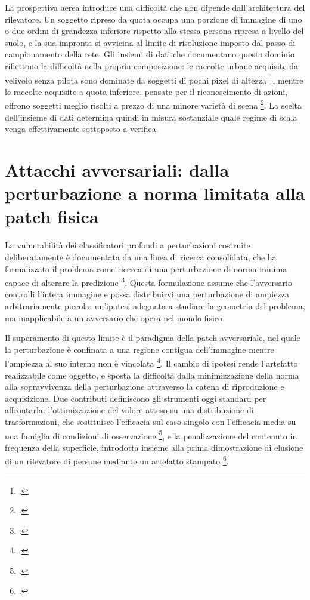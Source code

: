 \documentclass[a4paper,12pt]{report}
\begin{document}
La prospettiva aerea introduce una difficoltà che non dipende dall'architettura
del rilevatore. Un soggetto ripreso da quota occupa una porzione di immagine di
uno o due ordini di grandezza inferiore rispetto alla stessa persona ripresa a
livello del suolo, e la sua impronta si avvicina al limite di risoluzione
imposto dal passo di campionamento della rete. Gli insiemi di dati che
documentano questo dominio riflettono la difficoltà nella propria composizione:
le raccolte urbane acquisite da velivolo senza pilota sono dominate da soggetti
di pochi pixel di altezza \footcite{zhu_2021_visdrone}, mentre le raccolte
acquisite a quota inferiore, pensate per il riconoscimento di azioni, offrono
soggetti meglio risolti a prezzo di una minore varietà di scena
\footcite{barekatain_2017_okutama}. La scelta dell'insieme di dati determina
quindi in misura sostanziale quale regime di scala venga effettivamente
sottoposto a verifica.

\section{Attacchi avversariali: dalla perturbazione a norma limitata alla patch fisica}
\label{sec:sota_adversarial}

La vulnerabilità dei classificatori profondi a perturbazioni costruite
deliberatamente è documentata da una linea di ricerca consolidata, che ha
formalizzato il problema come ricerca di una perturbazione di norma minima
capace di alterare la predizione \footcite{carlini_2017}. Questa formulazione
assume che l'avversario controlli l'intera immagine e possa distribuirvi una
perturbazione di ampiezza arbitrariamente piccola: un'ipotesi adeguata a
studiare la geometria del problema, ma inapplicabile a un avversario che opera
nel mondo fisico.

Il superamento di questo limite è il paradigma della patch avversariale, nel
quale la perturbazione è confinata a una regione contigua dell'immagine mentre
l'ampiezza al suo interno non è vincolata \footcite{brown_2017_patch}. Il
cambio di ipotesi rende l'artefatto realizzabile come oggetto, e sposta la
difficoltà dalla minimizzazione della norma alla sopravvivenza della
perturbazione attraverso la catena di riproduzione e acquisizione. Due
contributi definiscono gli strumenti oggi standard per affrontarla:
l'ottimizzazione del valore atteso su una distribuzione di trasformazioni, che
sostituisce l'efficacia sul caso singolo con l'efficacia media su una famiglia di
condizioni di osservazione \footcite{athalye_2018_eot}, e la penalizzazione del
contenuto in frequenza della superficie, introdotta insieme alla prima
dimostrazione di elusione di un rilevatore di persone mediante un artefatto
stampato \footcite{thys_2019}.
\end{document}
